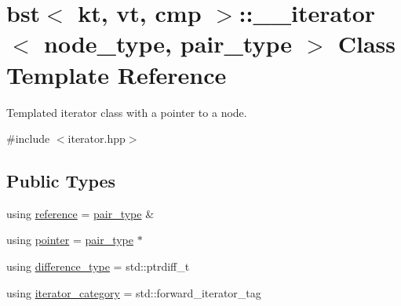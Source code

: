 \hypertarget{classbst_1_1____iterator}{}\section{bst$<$ kt, vt, cmp $>$\+:\+:\+\_\+\+\_\+iterator$<$ node\+\_\+type, pair\+\_\+type $>$ Class Template Reference}
\label{classbst_1_1____iterator}


Templated iterator class with a pointer to a node.  




{\ttfamily \#include $<$iterator.\+hpp$>$}

\subsection*{Public Types}
\begin{DoxyCompactItemize}
\item 
using \hyperlink{classbst_1_1____iterator_a3189983e4edb73a8ce449b290ceb97d1}{reference} = \hyperlink{classbst_a7b11cca2a3b4394915600194f741ab16}{pair\+\_\+type} \&
\item 
using \hyperlink{classbst_1_1____iterator_adb4d1d8f8048f7036ff5ac383ea9c649}{pointer} = \hyperlink{classbst_a7b11cca2a3b4394915600194f741ab16}{pair\+\_\+type} $\ast$
\item 
using \hyperlink{classbst_1_1____iterator_a4a4371f84bac8f8717fe4fdf57a9119d}{difference\+\_\+type} = std\+::ptrdiff\+\_\+t
\item 
using \hyperlink{classbst_1_1____iterator_a180502873d890f2293f977dd3ace4079}{iterator\+\_\+category} = std\+::forward\+\_\+iterator\+\_\+tag
\end{DoxyCompactItemize}

